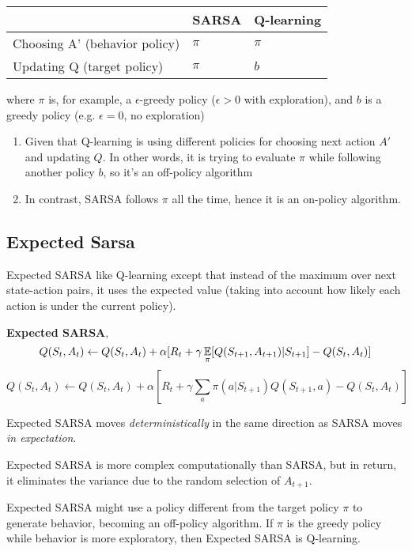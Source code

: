 \documentclass[sutton_barto_notes.tex]{subfiles}
\begin{document}
\begin{table}[h!]
\begin{tabular}{lll}
            & SARSA              & Q-learning         \\ \hline
Choosing A' (behavior policy) & $\pi$ & $\pi$ \\ \hline
Updating Q (target policy) & $\pi$ & $b$    \\ \hline             
\end{tabular}
\end{table}
where $\pi$ is, for example, a $\epsilon$-greedy policy ($\epsilon > 0$ with exploration), and $b$ is a greedy policy (e.g. $\epsilon = 0$, no exploration)

\begin{enumerate}
\item Given that Q-learning is using different policies for choosing next action $A'$ and updating $Q$. In other words, it is trying to evaluate $\pi$ while following another policy $b$, so it's an off-policy algorithm
\item In contrast, SARSA follows $\pi$ all the time, hence it is an on-policy algorithm.
\end{enumerate}

\subsection{Expected Sarsa}

Expected SARSA like Q-learning except that instead of the maximum over next state-action pairs, it uses the expected value (taking into account how likely each action is under the current policy).

\begin{definition}
\textbf{Expected SARSA},
$$Q(S_t, A_t)\leftarrow Q(S_t, A_t) + \alpha [R_t + \gamma \operatorname*{\mathbb{E}}_\pi [Q(S_{t+1}, A_{t+1})|S_{t+1}] - Q(S_t, A_t)]$$
$$Q(S_t, A_t)\leftarrow Q(S_t, A_t) + \alpha [R_t + \gamma \sum_a \pi(a|S_{t+1})Q(S_{t+1},a) - Q(S_t, A_t)]$$
\end{definition}

Expected SARSA moves \textit{deterministically} in the same direction as SARSA moves \textit{in expectation}.

Expected SARSA is more complex computationally than SARSA, but in return, it eliminates the variance due to the random selection of $A_{t+1}$.

Expected SARSA might use a policy different from the target policy $\pi$ to generate behavior, becoming an off-policy algorithm. If $\pi$ is the greedy policy while behavior is more exploratory, then Expected SARSA is Q-learning.
\end{document}
